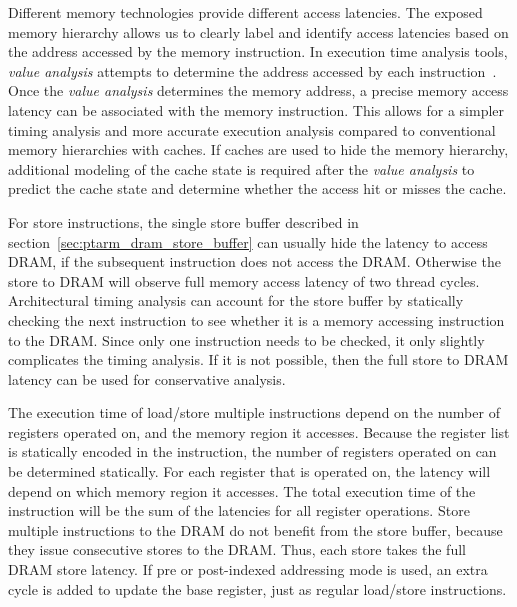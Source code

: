 Different memory technologies provide different access latencies. 
The exposed memory hierarchy allows us to clearly label and identify access latencies based on the address accessed by the memory instruction.
In execution time analysis tools, \emph{value analysis} attempts to determine the address accessed by each instruction~\cite{wilhelm-survey-paper}.
Once the \emph{value analysis} determines the memory address, a precise memory access latency can be associated with the memory instruction.    
This allows for a simpler timing analysis and more accurate execution analysis compared to conventional memory hierarchies with caches. 
If caches are used to hide the memory hierarchy, additional modeling of the cache state is required after the \emph{value analysis} to predict the cache state and determine whether the access hit or misses the cache. 

For store instructions, the single store buffer described in section~\ref{sec:ptarm_dram_store_buffer} can usually hide the latency to access DRAM, if the subsequent instruction does not access the DRAM. 
Otherwise the store to DRAM will observe full memory access latency of two thread cycles.
Architectural timing analysis can account for the store buffer by statically checking the next instruction to see whether it is a memory accessing instruction to the DRAM.
Since only one instruction needs to be checked, it only slightly complicates the timing analysis.
If it is not possible, then the full store to DRAM latency can be used for conservative analysis. 

The execution time of load/store multiple instructions depend on the number of registers operated on, and the memory region it accesses. 
Because the register list is statically encoded in the instruction, the number of registers operated on can be determined statically.
For each register that is operated on, the latency will depend on which memory region it accesses. 
The total execution time of the instruction will be the sum of the latencies for all register operations. 
Store multiple instructions to the DRAM do not benefit from the store buffer, because they issue consecutive stores to the DRAM. 
Thus, each store takes the full DRAM store latency.
If pre or post-indexed addressing mode is used, an extra cycle is added to update the base register, just as regular load/store instructions. 


